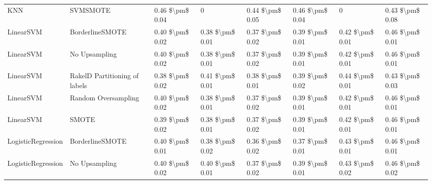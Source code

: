 \begin{tabular}{llllllll}
                            KNN &                      SVMSMOTE & 0.46 \$\textbackslash pm\$ 0.04 &                         0 &       0.44 \$\textbackslash pm\$ 0.05 &        0.46 \$\textbackslash pm\$ 0.04 &                                       0 &     0.43 \$\textbackslash pm\$ 0.08 \\
                      LinearSVM &               BorderlineSMOTE & 0.40 \$\textbackslash pm\$ 0.02 &           0.38 \$\textbackslash pm\$ 0.01 &       0.37 \$\textbackslash pm\$ 0.02 &        0.39 \$\textbackslash pm\$ 0.01 &                         0.42 \$\textbackslash pm\$ 0.01 &     0.46 \$\textbackslash pm\$ 0.01 \\
                      LinearSVM &                 No Upsampling & 0.40 \$\textbackslash pm\$ 0.02 &           0.38 \$\textbackslash pm\$ 0.01 &       0.37 \$\textbackslash pm\$ 0.02 &        0.39 \$\textbackslash pm\$ 0.01 &                         0.42 \$\textbackslash pm\$ 0.01 &     0.46 \$\textbackslash pm\$ 0.01 \\
                      LinearSVM & RakelD Partitioning of labels & 0.38 \$\textbackslash pm\$ 0.02 &           0.41 \$\textbackslash pm\$ 0.01 &       0.38 \$\textbackslash pm\$ 0.01 &        0.39 \$\textbackslash pm\$ 0.02 &                         0.44 \$\textbackslash pm\$ 0.01 &     0.43 \$\textbackslash pm\$ 0.03 \\
                      LinearSVM &           Random Oversampling & 0.40 \$\textbackslash pm\$ 0.02 &           0.38 \$\textbackslash pm\$ 0.01 &       0.37 \$\textbackslash pm\$ 0.02 &        0.39 \$\textbackslash pm\$ 0.01 &                         0.42 \$\textbackslash pm\$ 0.01 &     0.46 \$\textbackslash pm\$ 0.01 \\
                      LinearSVM &                         SMOTE & 0.39 \$\textbackslash pm\$ 0.02 &           0.38 \$\textbackslash pm\$ 0.01 &       0.37 \$\textbackslash pm\$ 0.02 &        0.39 \$\textbackslash pm\$ 0.01 &                         0.42 \$\textbackslash pm\$ 0.01 &     0.46 \$\textbackslash pm\$ 0.01 \\
             LogisticRegression &               BorderlineSMOTE & 0.40 \$\textbackslash pm\$ 0.01 &           0.38 \$\textbackslash pm\$ 0.02 &       0.36 \$\textbackslash pm\$ 0.02 &        0.37 \$\textbackslash pm\$ 0.01 &                         0.43 \$\textbackslash pm\$ 0.01 &     0.46 \$\textbackslash pm\$ 0.01 \\
             LogisticRegression &                 No Upsampling & 0.40 \$\textbackslash pm\$ 0.02 &           0.40 \$\textbackslash pm\$ 0.01 &       0.37 \$\textbackslash pm\$ 0.02 &        0.39 \$\textbackslash pm\$ 0.01 &                         0.43 \$\textbackslash pm\$ 0.02 &     0.46 \$\textbackslash pm\$ 0.02 \\

\end{tabular}
